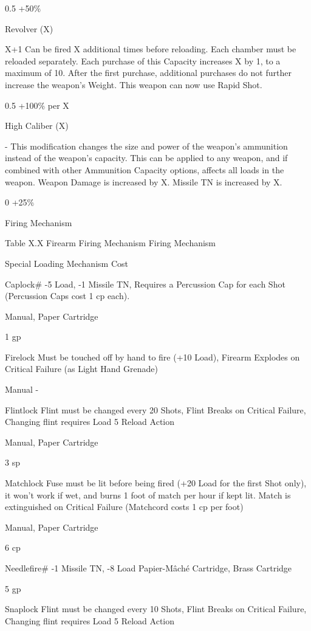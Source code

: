 \documentclass[oneside,11pt,english]{book}
\begin{document}
0.5 +50\% 

Revolver 
(X) 

X+1 Can be fired X additional times before reloading. Each chamber must be reloaded 
separately. Each purchase of this Capacity increases X by 1, to a maximum of 10. 
After the first purchase, additional purchases do not further increase the weapon’s 
Weight. 
This weapon can now use Rapid Shot. 

0.5 +100\% per 
X 

High 
Caliber 
(X) 

- This modification changes the size and power of the weapon’s ammunition instead of 
the weapon’s capacity. This can be applied to any weapon, and if combined with 
other Ammunition Capacity options, affects all loads in the weapon. 
Weapon Damage is increased by X. Missile TN is increased by X. 

0 +25\% 


 
Firing Mechanism 

 
Table X.X Firearm Firing Mechanism 
Firing 
Mechanism 

Special Loading Mechanism Cost 

Caplock\# -5 Load, -1 Missile TN, Requires a Percussion Cap for each Shot (Percussion 
Caps cost 1 cp each). 

Manual, Paper 
Cartridge 

1 gp 

Firelock Must be touched off by hand to fire (+10 Load), Firearm Explodes on Critical 
Failure (as Light Hand Grenade) 

Manual - 

Flintlock Flint must be changed every 20 Shots, Flint Breaks on Critical Failure, 
Changing flint requires Load 5 Reload Action 

Manual, Paper 
Cartridge 

3 sp 

Matchlock Fuse must be lit before being fired (+20 Load for the first Shot only), it won’t 
work if wet, and burns 1 foot of match per hour if kept lit. Match is 
extinguished on Critical Failure (Matchcord costs 1 cp per foot) 

Manual, Paper 
Cartridge 

6 cp 

Needlefire\# -1 Missile TN, -8 Load Papier-Mâché 
Cartridge, Brass 
Cartridge 

5 gp 

Snaplock Flint must be changed every 10 Shots, Flint Breaks on Critical Failure, 
Changing flint requires Load 5 Reload Action 
\end{document}
